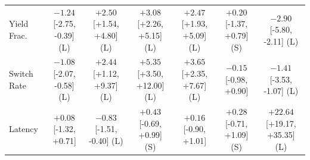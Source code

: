 \begin{table}[ht]
\begin{tabular}{lcccccc}
Yield Frac. & $-1.24$ [-2.75, -0.39] (L) & $+2.50$ [+1.54, +4.80] (L) & $+3.08$ [+2.26, +5.15] (L) & $+2.47$ [+1.93, +5.09] (L) & $+0.20$ [-1.37, +0.79] (S) & $-2.90$ [-5.80, -2.11] (L) \\
Switch Rate & $-1.08$ [-2.07, -0.58] (L) & $+2.44$ [+1.12, +9.37] (L) & $+5.35$ [+3.50, +12.00] (L) & $+3.65$ [+2.35, +7.67] (L) & $-0.15$ [-0.98, +0.90] & $-1.41$ [-3.53, -1.07] (L) \\
Latency & $+0.08$ [-1.32, +0.71] & $-0.83$ [-1.51, -0.40] (L) & $+0.43$ [-0.69, +0.99] (S) & $+0.16$ [-0.90, +1.01] & $+0.28$ [-0.71, +1.09] (S) & $+22.64$ [+19.17, +35.35] (L) \\
\bottomrule
\end{tabular}
\end{table}
